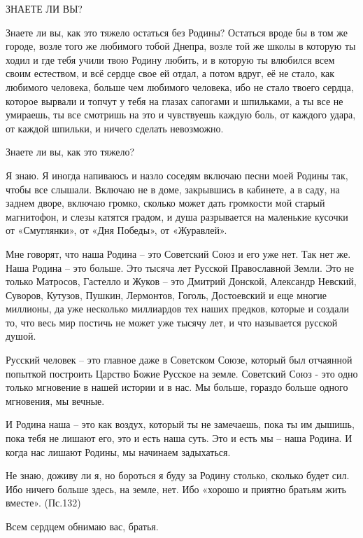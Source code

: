  
 
 
 
 

ЗНАЕТЕ ЛИ ВЫ?

Знаете ли вы, как это тяжело остаться без Родины? Остаться вроде бы в том же
городе, возле того же любимого тобой Днепра, возле той же школы в которую ты
ходил и где тебя учили твою Родину любить, и в которую ты влюбился всем своим
естеством, и всё сердце свое ей отдал, а потом вдруг, её не стало, как любимого
человека, больше чем любимого человека, ибо не стало твоего сердца, которое
вырвали и топчут у тебя на глазах сапогами и шпильками, а ты все не умираешь,
ты все смотришь на это и чувствуешь каждую боль, от каждого удара, от каждой
шпильки, и ничего сделать невозможно. 

Знаете ли вы, как это тяжело?

Я знаю. Я иногда напиваюсь и назло соседям включаю песни моей Родины так, чтобы
все слышали. Включаю не в доме, закрывшись в кабинете, а в саду, на заднем
дворе, включаю громко, сколько может дать громкости мой старый магнитофон, и
слезы катятся градом, и душа разрывается на маленькие кусочки от «Смуглянки»,
от «Дня Победы», от «Журавлей». 

Мне говорят, что наша Родина – это Советский Союз и его уже нет. Так нет же.
Наша Родина – это больше. Это тысяча лет Русской Православной Земли. Это не
только Матросов, Гастелло и Жуков – это Дмитрий Донской, Александр Невский,
Суворов, Кутузов, Пушкин, Лермонтов, Гоголь, Достоевский и еще многие миллионы,
да уже несколько миллиардов тех наших предков, которые и создали то, что весь
мир постичь не может уже тысячу лет, и что называется русской душой. 

Русский человек – это главное даже в Советском Союзе, который был отчаянной
попыткой построить Царство Божие Русское на земле. Советский Союз - это одно
только мгновение в нашей истории и в нас. Мы больше, гораздо больше одного
мгновения, мы вечные. 

И Родина наша – это как воздух, который ты не замечаешь, пока ты им дышишь,
пока тебя не лишают его, это и есть наша суть. Это и есть мы – наша Родина. И
когда нас лишают Родины, мы начинаем задыхаться.

Не знаю, доживу ли я, но бороться я буду за Родину столько, сколько будет сил.
Ибо ничего больше здесь, на земле, нет. Ибо «хорошо и приятно братьям жить
вместе». (Пс.132)

Всем сердцем обнимаю вас, братья.

